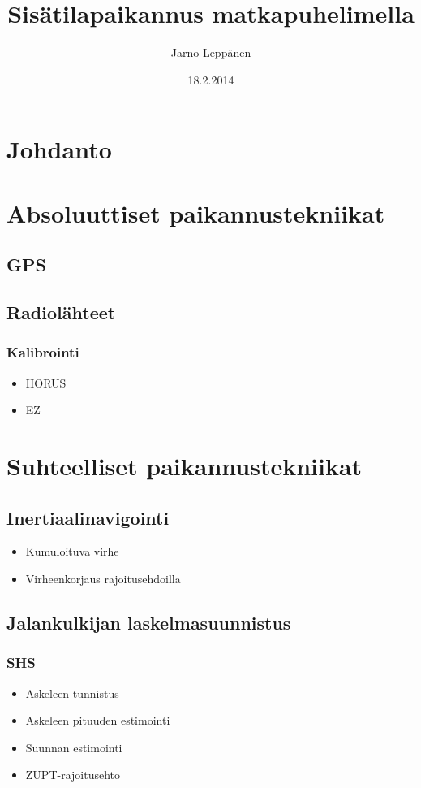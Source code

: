 \documentclass[a4paper]{scrartcl}
\author{Jarno Leppänen}
\title{Sisätilapaikannus matkapuhelimella}
\date{18.2.2014}
\begin{document}
\maketitle
\makeglossaries



\tableofcontents

\section{Johdanto}

\section{Absoluuttiset paikannustekniikat}
\subsection{GPS}
\cite{groves2013principles}
\subsection{Radiolähteet}
\cite{varshavsky2005gsm}
\subsubsection{Kalibrointi}
\begin{itemize}
\item HORUS
\item EZ
\end{itemize}

\section{Suhteelliset paikannustekniikat}
\subsection{Inertiaalinavigointi}
\begin{itemize}
\item Kumuloituva virhe
\item Virheenkorjaus rajoitusehdoilla
\end{itemize}
\cite{groves2013principles}
\subsection{Jalankulkijan laskelmasuunnistus}
\cite{harle2013survey}
\subsubsection{SHS}
\begin{itemize}
\item Askeleen tunnistus
\item Askeleen pituuden estimointi
\item Suunnan estimointi
\item ZUPT-rajoitusehto
\end{itemize}
\end{document}
